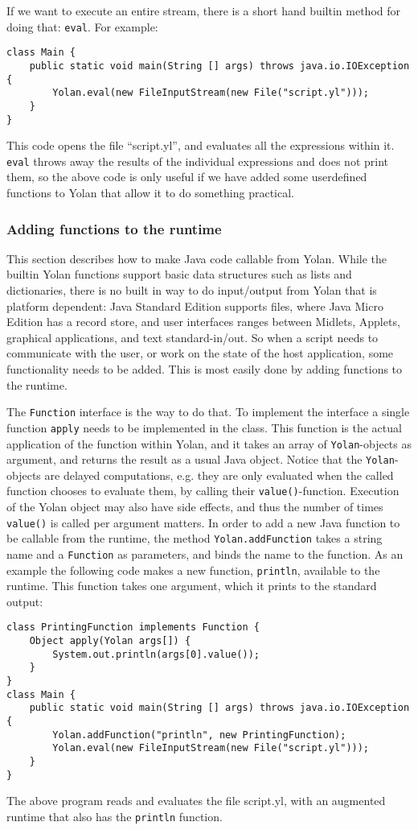 \documentclass[11pt]{report}
\begin{document}
If we want to execute an entire stream, there is a short hand builtin method for doing that: \verb|eval|. For example:
\begin{lstlisting}
class Main {
    public static void main(String [] args) throws java.io.IOException {
        Yolan.eval(new FileInputStream(new File("script.yl")));
    }
}
\end{lstlisting}
This code opens the file ``script.yl'', and evaluates all the expressions within it. 
\verb|eval| throws away the results of the individual expressions and does not print them,
so the above code is only useful if we have added some userdefined functions to Yolan that allow it to do something practical.

\subsubsection{Adding functions to the runtime}
This section describes how to make Java code callable from Yolan.
While the builtin Yolan functions support basic data structures such as lists and dictionaries,  there is no built in way to do input/output from Yolan that is platform dependent: Java Standard Edition supports files, where Java Micro Edition has a record store, and user interfaces ranges between Midlets, Applets, graphical applications, and text standard-in/out.
So when a script needs to communicate with the user, or work on the state of the host application, 
some functionality needs to be added. This is most easily done by adding functions to the runtime.

The \verb|Function| interface is the way to do that. To implement the interface a single function \verb|apply| needs to be implemented in the class. 
This function is the actual application of the function within Yolan, and
it takes an array of \verb|Yolan|-objects as argument, and returns the result as a usual Java object.
Notice that the \verb|Yolan|-objects are delayed computations, e.g. they are only evaluated when the called function chooses to evaluate them, by calling their \verb|value()|-function.
Execution of the Yolan object may also have side effects, and thus the number of times \verb|value()| is called per argument matters.
In order to add a new Java function to be callable from the runtime, the method \verb|Yolan.addFunction| takes a string name and a \verb|Function| as parameters, and binds the name to the function. As an example the following code makes a new function, \verb|println|, available to the runtime. This function takes one argument, which it prints to the standard output:
\begin{lstlisting}
class PrintingFunction implements Function {
    Object apply(Yolan args[]) {
        System.out.println(args[0].value());
    }
}
class Main {
    public static void main(String [] args) throws java.io.IOException {
        Yolan.addFunction("println", new PrintingFunction);
        Yolan.eval(new FileInputStream(new File("script.yl")));
    }
}
\end{lstlisting} 
The above program reads and evaluates the file script.yl, with an augmented runtime that also has the \verb|println| function.
\end{document}
